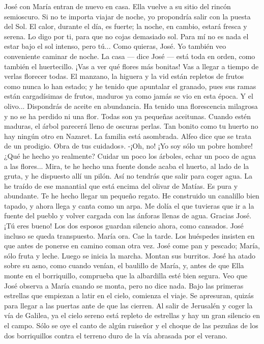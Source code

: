 \documentclass[12pt]{book} %
\begin{document}
José con María entran de nuevo en casa. Ella vuelve a su sitio del rincón semioscuro. 
Si no te importa viajar de noche, yo propondría salir con la puesta del Sol. El calor, durante el día, es fuerte; la noche, 
en cambio, estará fresca y serena. Lo digo por ti, para que no cojas demasiado sol. Para mí no es nada el estar bajo el sol intenso, pero tú... 
Como quieras, José. Yo también veo conveniente caminar de noche. 
La casa — dice José — está toda en orden, como también el huertecillo. ¡Vas a ver qué flores más bonitas! Vas a llegar 
a tiempo de verlas florecer todas. El manzano, la higuera y la vid están repletos de frutos como nunca lo han estado; y he tenido que apuntalar el granado, pues sus ramas están cargadísimas de frutos, maduros ya como jamás se vio en esta época. Y el olivo... Dispondrás de aceite en abundancia. Ha tenido una florescencia milagrosa y no se ha perdido ni una flor. Todas son ya pequeñas aceitunas. Cuando estén maduras, el árbol parecerá lleno de oscuras perlas. Tan bonito como tu huerto no hay ningún otro en Nazaret. La familia está asombrada. Alfeo dice que se trata de un prodigio. 
Obra de tus cuidados». 
-¡Oh, no! ¡Yo soy sólo un pobre hombre! ¿Qué he hecho yo realmente? Cuidar un poco los árboles, echar un poco de 
agua a las flores... Mira, te he hecho una fuente donde acaba el huerto, al lado de la gruta, y he dispuesto allí un pilón. Así no tendrás que salir para coger agua. La he traído de ese manantial que está encima del olivar de Matías. Es pura y abundante. Te he hecho llegar un pequeño regato. He construido un canalillo bien tapado, y ahora llega y canta como un arpa. Me dolía el que tuvieras que ir a la fuente del pueblo y volver cargada con las ánforas llenas de agua. 
Gracias José. ¡Tú eres bueno! 
Los dos esposos guardan silencio ahora, como cansados. José incluso se queda transpuesto. María ora. Cae la tarde. 
Los huéspedes insisten en que antes de ponerse en camino coman otra vez. José come pan y pescado; María, sólo fruta 
y leche. 
Luego se inicia la marcha. Montan sus burritos. José ha atado sobre su asno, como cuando venían, el baulillo de María, 
y, antes de que Ella monte en el borriquillo, comprueba que la albardilla esté bien segura. Veo que José observa a María cuando se monta, pero no dice nada. 
Bajo las primeras estrellas que empiezan a latir en el cielo, comienza el viaje. Se apresuran, quizás para llegar a las 
puertas ante de que las cierren. Al salir de Jerusalén y coger la vía de Galilea, ya el cielo sereno está repleto de estrellas y hay un gran silencio en el campo. Sólo se oye el canto de algún ruiseñor y el choque de las pezuñas de los dos borriquillos contra el terreno duro de la vía abrasada por el verano. 
\end{document}
